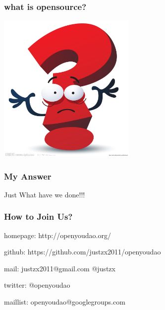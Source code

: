 \documentclass[10pt]{beamer}
\begin{document}
\begin{frame}
  \frametitle{\Large{what is opensource?}}

\begin{center} 
\includegraphics[width=0.5\textwidth]{whatisopensource.jpg}

\end{center}

\end{frame}

\begin{frame}
  \frametitle{\Large{My Answer}}

\Huge{Just What have we done!!!}

\end{frame}

\begin{frame}
  \frametitle{How to Join Us?}

\begin{itemize}
\Large{
  \item homepage: http://openyoudao.org/
  \item github:
   https://github.com/justzx2011/openyoudao
  \item mail: justzx2011@gmail.com  @justzx
  \item twitter: @openyoudao
  \item maillist: openyoudao@googlegroups.com
}
  
\end{itemize}

\end{frame}
\end{document}
